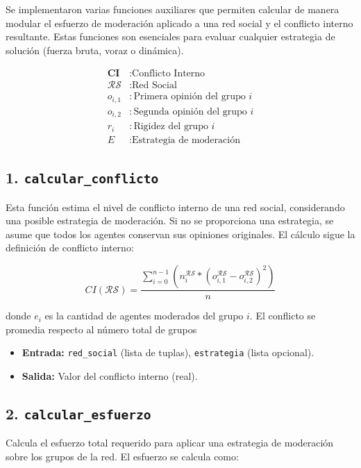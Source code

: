 \documentclass[11pt,letter]{article}
\begin{document}
    Se implementaron varias funciones auxiliares que permiten calcular de manera modular el esfuerzo de moderación aplicado a una red social y el conflicto interno resultante. Estas funciones son esenciales para evaluar cualquier estrategia de solución (fuerza bruta, voraz o dinámica).

    \[
        \begin{aligned}
            \textbf{CI} &: \text{Conflicto Interno} \\
            \mathcal{RS} &: \text{Red Social} \\
            o_{i,1} &: \text{Primera opinión del grupo } i \\
            o_{i,2} &: \text{Segunda opinión del grupo } i \\
            r_i &: \text{Rigidez del grupo } i \\
            E &: \text{Estrategia de moderación}
        \end{aligned}
    \]


    \subsection*{1. \texttt{calcular\_conflicto}}
    Esta función estima el nivel de conflicto interno de una red social, considerando una posible estrategia de moderación. Si no se proporciona una estrategia, se asume que todos los agentes conservan sus opiniones originales. El cálculo sigue la definición de conflicto interno:

    \[
        CI(\mathcal{RS}) = \frac{\sum_{i=0}^{n-1} \left(n_i^\mathcal{RS} \ast \left(o_{i,1}^\mathcal{RS} - o_{i,2}^\mathcal{RS}\right)^2\right)}{n}
    \]

    donde $e_i$ es la cantidad de agentes moderados del grupo $i$. El conflicto se promedia respecto al número total de grupos

    \begin{itemize}
        \item \textbf{Entrada:} \texttt{red\_social} (lista de tuplas), \texttt{estrategia} (lista opcional).
        \item \textbf{Salida:} Valor del conflicto interno (real).
    \end{itemize}

    \subsection*{2. \texttt{calcular\_esfuerzo}}
    Calcula el esfuerzo total requerido para aplicar una estrategia de moderación sobre los grupos de la red. El esfuerzo se calcula como:
\end{document}
